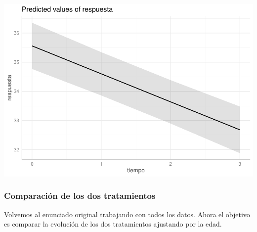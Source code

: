 \documentclass[
]{book}
\newenvironment{Shaded}{\begin{snugshade}}{\end{snugshade}}
\newcommand{\CommentTok}[1]{\textcolor[rgb]{0.56,0.35,0.01}{\textit{#1}}}
\newcommand{\FunctionTok}[1]{\textcolor[rgb]{0.00,0.00,0.00}{#1}}
\newcommand{\NormalTok}[1]{#1}
\newcommand{\OtherTok}[1]{\textcolor[rgb]{0.56,0.35,0.01}{#1}}
\newcommand{\SpecialCharTok}[1]{\textcolor[rgb]{0.00,0.00,0.00}{#1}}
\newcommand{\StringTok}[1]{\textcolor[rgb]{0.31,0.60,0.02}{#1}}
\begin{document}
\includegraphics{fig_out/unnamed-chunk-132-1.pdf}

\hypertarget{comparaciuxf3n-de-los-dos-tratamientos}{%
\subsubsection{Comparación de los dos tratamientos}\label{comparaciuxf3n-de-los-dos-tratamientos}}

\begin{Shaded}
\end{Shaded}

Volvemos al enunciado original trabajando con todos los datos. Ahora el objetivo es comparar la evolución de los dos tratamientos ajustando por la edad.
\end{document}
